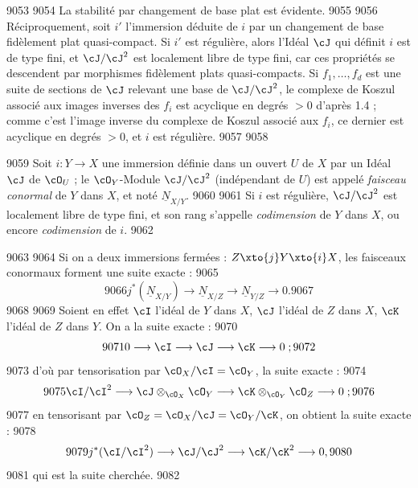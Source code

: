   9053	
  9054	La stabilit\'e par changement de base plat est \'evidente.
  9055	
  9056	R\'eciproquement, soit $i'$ l'immersion d\'eduite de $i$ par un changement de base fid\`element plat quasi-compact. Si $i'$ est r\'eguli\`ere, alors l'Id\'eal $\cJ$ qui d\'efinit $i$ est de type fini, et $\cJ/\cJ^2$ est localement libre de type fini, car ces propri\'et\'es se descendent par morphismes fid\`element plats quasi-compacts. Si $f_1,\dots,f_d$ est une suite de sections de $\cJ$ relevant une base de $\cJ/\cJ^2$, le complexe de Koszul associ\'e aux images inverses des $f_i$ est acyclique en degr\'es $> 0$ d'apr\`es 1.4 ; comme c'est l'image inverse du complexe de Koszul associ\'e aux $f_i$, ce dernier est acyclique en degr\'es $> 0$, et $i$ est r\'eguli\`ere.
  9057	
  9058	\begin{definition}[1.6]
  9059	Soit $i: Y \to X$ une immersion d\'efinie dans un ouvert $U$ de $X$ par un Id\'eal $\cJ$ de $\cO_U$ ; le $\cO_Y$-Module $\cJ/\cJ^2$ (ind\'ependant de $U$) est appel\'e \emph{faisceau conormal} de $Y$ dans $X$, et not\'e $\underline{N}_{X/Y}$.
  9060	
  9061	Si $i$ est r\'eguli\`ere, $\cJ/\cJ^2$ est localement libre de type fini, et son rang s'appelle \emph{codimension} de $Y$ dans $X$, ou encore \emph{codimension} de $i$.
  9062	\end{definition}
  9063	
  9064	Si on a deux immersions ferm\'ees : $Z \xto{j} Y \xto{i} X$, les faisceaux conormaux forment une suite exacte :
  9065	\begin{equation}\label{eq:1.6.1}
  9066	j^{*}(\underline{N}_{X/Y}) \longrightarrow \underline{N}_{X/Z} \longrightarrow \underline{N}_{Y/Z} \longrightarrow 0.
  9067	\end{equation}
  9068	
  9069	Soient en effet $\cI$ l'id\'eal de $Y$ dans $X$, $\cJ$ l'id\'eal de $Z$ dans $X$, $\cK$ l'id\'eal de $Z$ dans $Y$. On a la suite exacte :
  9070	\[
  9071	0 \longrightarrow \cI \longrightarrow \cJ \longrightarrow \cK \longrightarrow 0 \; ;
  9072	\]
  9073	d'o\`u par tensorisation par $\cO_X/\cI = \cO_Y$, la suite exacte :
  9074	\[
  9075	\cI/\cI^2 \longrightarrow \cJ \otimes_{\cO_X} \cO_Y \longrightarrow \cK \otimes_{\cO_Y} \cO_Z \longrightarrow 0 \; ;
  9076	\]
  9077	en tensorisant par $\cO_Z = \cO_X/\cJ = \cO_Y/\cK$, on obtient la suite exacte :
  9078	\[
  9079	j^{*}(\cI/\cI^2) \longrightarrow \cJ/\cJ^2 \longrightarrow \cK/\cK^2 \longrightarrow 0,
  9080	\]
  9081	qui est la suite cherch\'ee.
  9082	
